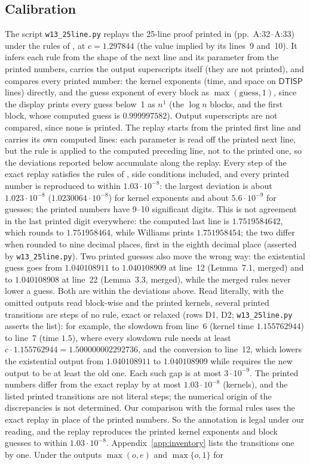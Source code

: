 \documentclass[11pt]{article}
\theoremstyle{definition}
\newcommand{\DTISP}{\mathsf{DTISP}}
\newcommand{\leanus}{\textunderscore\allowbreak}
\newcommand{\lean}[1]{\ifmmode\text{\ttfamily #1}\else{\ttfamily\let\_\leanus #1}\fi}
\begin{document}
\subsection{Calibration}\label{sec:calibration}
The script \texttt{w13\_25line.py} replays the 25-line proof printed in \cite[\S7.2]{W13} (pp.~A:32--A:33) under the rules of \lean{HY.Step}, at $c=1.297844$ (the value implied by its lines~9 and~10). It infers each rule from the shape of the next line and its parameter from the printed numbers, carries the output superscripts itself (they are not printed), and compares every printed number: the kernel exponents (time, and space on $\DTISP$ lines) directly, and the guess exponent of every block as $\max(\text{guess},1)$, since the display prints every guess below~1 as $n^1$ (the $\log n$ blocks, and the first block, whose computed guess is $0.999997582$). Output superscripts are not compared, since none is printed. The replay starts from the printed first line and carries its own computed lines: each parameter is read off the printed next line, but the rule is applied to the computed preceding line, not to the printed one, so the deviations reported below accumulate along the replay. Every step of the exact replay satisfies the rules of \lean{HY.Step}, side conditions included, and every printed number is reproduced to within $1.03\cdot10^{-8}$: the largest deviation is about $1.023\cdot10^{-8}$ ($1.0230064\cdot10^{-8}$) for kernel exponents and about $5.6\cdot10^{-9}$ for guesses; the printed numbers have 9--10 significant digits. This is not agreement in the last printed digit everywhere: the computed last line is $1.7519584642$, which rounds to $1.751958464$, while Williams prints $1.751958454$; the two differ when rounded to nine decimal places, first in the eighth decimal place (asserted by \texttt{w13\_25line.py}). Two printed guesses also move the wrong way: the existential guess goes from $1.040108911$ to $1.040108909$ at line~12 (Lemma~7.1, merged) and to $1.040108908$ at line~22 (Lemma~3.3, merged), while the merged rules never lower a guess. Both are within the deviations above. Read literally, with the omitted outputs read block-wise and the printed kernels, several printed transitions are steps of no rule, exact or relaxed (rows D1, D2; \texttt{w13\_25line.py} asserts the list): for example, the slowdown from line~6 (kernel time $1.155762944$) to line~7 (time $1.5$), where every slowdown rule needs at least $c\cdot1.155762944=1.500000002292736$, and the conversion to line~12, which lowers the existential output from $1.040108911$ to $1.040108909$ while \lean{convM} requires the new output to be at least the old one. Each such gap is at most $3\cdot10^{-9}$. The printed numbers differ from the exact replay by at most $1.03\cdot10^{-8}$ (kernels), and the listed printed transitions are not literal steps; the numerical origin of the discrepancies is not determined. Our comparison with the formal rules uses the exact replay in place of the printed numbers. So the annotation is legal under our reading, and the replay reproduces the printed kernel exponents and block guesses to within $1.03\cdot10^{-8}$. Appendix~\ref{app:inventory} lists the transitions one by one. Under the outputs $\max(o,e)$ and $\max\{o,1\}$ for 
\end{document}
